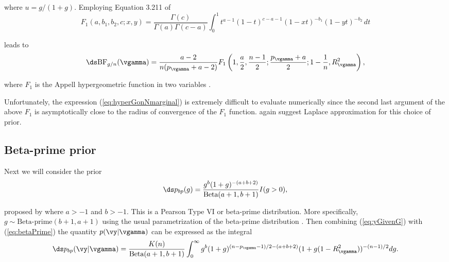 \noindent where $u=g/(1+g)$. Employing 
Equation 3.211 of \cite{Gradshteyn1988} 
$$
F_1(a,b_1,b_2,c; x,y) = \frac{\Gamma(c)} {\Gamma(a)\Gamma(c-a)} 
\int_0^1 t^{a-1} (1-t)^{c-a-1} (1-xt)^{-b_1} (1-yt)^{-b_2} \, dt
$$

\noindent 
leads to
\begin{equation}\label{eq:hyperGonNmarginal}
\ds \mbox{BF}_{g/n}(\vgamma) =  \frac{a - 2}{n(p_\vgamma + a - 2)} F_1\left( 1, \frac{a}{2}, \frac{n-1}{2}; \frac{p_\vgamma + a}{2}; 1  -  \frac{1}{n}, R_\vgamma^2 \right),
\end{equation}

\noindent where
$F_1$ is the Appell hypergeometric function in two variables 
\cite{Weisstein2009}. 






Unfortunately, the expression (\ref{eq:hyperGonNmarginal}) is extremely
difficult to evaluate numerically since the second last argument of the above 
$F_1$ is asymptotically close to the radius of convergence of the $F_1$
function.
\cite{Liang2008} again suggest Laplace approximation 
for this choice of prior. 

 
\subsection{Beta-prime prior} 
 
Next we will consider the prior 
\begin{equation}\label{eq:betaPrime}
\ds p_{bp}(g) = \frac{g^{b}(1 + g)^{-(a+b+2)}}{\mbox{Beta}(a+1,b+1)} I(g>0),
\end{equation}

\noindent proposed by \cite{Maruyama2011} where $a>-1$ and $b>-1$. 
This is a Pearson Type VI or beta-prime distribution. More specifically, 
$g\sim \mbox{Beta-prime}(b+1,a+1)$ using the usual parametrization of 
the beta-prime distribution \citep{Johnson1995}.
Then combining (\ref{eq:yGivenG}) with (\ref{eq:betaPrime}) the quantity $p(\vy|\vgamma)$ 
can be expressed as the integral
$$
\ds p_{bp}(\vy|\vgamma) 
=
\frac{K(n)}{\mbox{Beta}(a+1,b+1)}
\int_0^\infty             
g^{b}(1 + g)^{(n - p_\vgamma - 1)/2 - (a + b + 2)}  (1 + g (1-R_\vgamma^2) )^{-(n-1)/2}  
dg.
$$

